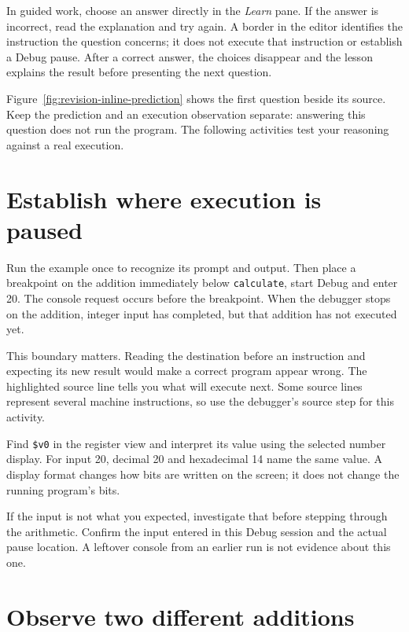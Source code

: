 In guided work, choose an answer directly in the \emph{Learn} pane. If the answer
is incorrect, read the explanation and try again. A border in the editor identifies
the instruction the question concerns; it does not execute that instruction or
establish a Debug pause. After a correct answer, the choices disappear and the
lesson explains the result before presenting the next question.

Figure~\ref{fig:revision-inline-prediction} shows the first question beside its
source. Keep the prediction and an execution observation separate: answering this
question does not run the program. The following activities test your reasoning
against a real execution.



\section{Establish where execution is paused}

Run the example once to recognize its prompt and output. Then place a breakpoint
on the addition immediately below \texttt{calculate}, start Debug and enter 20.
The console request occurs before the breakpoint. When the debugger stops on the
addition, integer input has completed, but that addition has not executed yet.

This boundary matters. Reading the destination before an instruction and expecting
its new result would make a correct program appear wrong. The highlighted source
line tells you what will execute next. Some source lines represent several machine
instructions, so use the debugger's source step for this activity.

Find \texttt{\$v0} in the register view and interpret its value using the selected
number display. For input 20, decimal 20 and hexadecimal 14 name the same value.
A display format changes how bits are written on the screen; it does not change
the running program's bits.

If the input is not what you expected, investigate that before stepping through the
arithmetic. Confirm the input entered in this Debug session and the actual pause
location. A leftover console from an earlier run is not evidence about this one.

\section{Observe two different additions}

